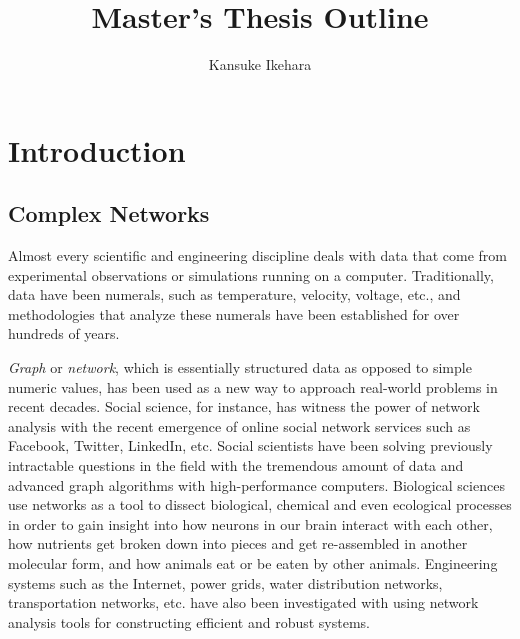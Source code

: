 \documentclass{article}
\begin{document}
\title{Master's Thesis Outline}
\author{Kansuke Ikehara}
\maketitle

\begin{abstract}

\end{abstract}
\tableofcontents


\section{Introduction}
	\subsection{Complex Networks}
	Almost every scientific and engineering discipline deals with data that come from experimental observations or simulations running on a computer. Traditionally, data have been numerals, such as temperature, velocity, voltage, etc., and methodologies that analyze these numerals have been established for over hundreds of years.
	
	 \textit{Graph} or \textit{network}, which is essentially structured data as opposed to simple numeric values, has been used as a new way to approach real-world problems in  recent decades. Social science, for instance, has witness the power of network analysis with the recent emergence of online social network services such as Facebook, Twitter, LinkedIn, etc.  Social scientists have been solving previously intractable questions in the field with the tremendous amount of  data and advanced graph algorithms with high-performance computers. Biological sciences use networks as a tool to dissect biological, chemical and even ecological processes in order to gain insight into how neurons in our brain interact with each other, how nutrients get broken down into pieces and get re-assembled in another molecular form, and how animals eat or be eaten by other animals. Engineering systems such as the Internet, power grids, water distribution networks, transportation networks, etc. have also been investigated with using network analysis tools for constructing efficient and robust systems. 
	
\end{document}
